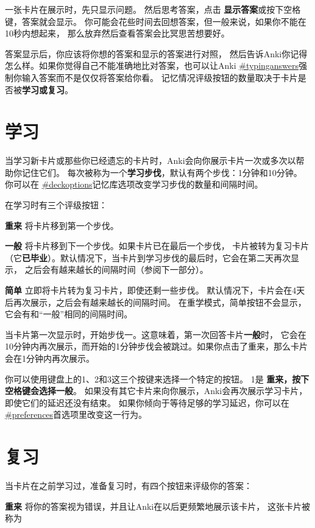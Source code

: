 \documentclass[a4paper]{book}
\begin{document}
	一张卡片在展示时，先只显示问题。 然后思考答案，点击
	\textbf{显示答案}或按下空格键，答案就会显示。 你可能会花些时间去回想答案，但一般来说，如果你不能在10秒内想起来， 那么放弃然后查看答案会比冥思苦想要好。
	
	答案显示后，你应该将你想的答案和显示的答案进行对照， 然后告诉Anki你记得怎么样。如果你觉得自己不能准确地比对答案，也可以让Anki
	\url{#typinganswers}强制你输入答案而不是仅仅将答案给你看。
	记忆情况评级按钮的数量取决于卡片是否被\textbf{学习或复习}。
	
	\section{学习}
	
	当学习新卡片或那些你已经遗忘的卡片时，Anki会向你展示卡片一次或多次以帮助你记住它们。 每次被称为一个\textbf{学习步伐}，默认有两个步伐：1分钟和10分钟。 你可以在
	\url{#deckoptions}记忆库选项改变学习步伐的数量和间隔时间。
	
	在学习时有三个评级按钮：
	
	\textbf{重来} 将卡片移到第一个步伐。
	
	\textbf{一般} 将卡片移到下一个步伐。如果卡片已在最后一个步伐， 卡片被转为复习卡片（它\textbf{已毕业}）。默认情况下，当卡片到学习步伐的最后时，它会在第二天再次显示， 之后会有越来越长的间隔时间（参阅下一部分）。
	
	\textbf{简单} 立即将卡片转为复习卡片，即使还剩一些步伐。 默认情况下，卡片会在4天后再次展示，之后会有越来越长的间隔时间。 在重学模式，简单按钮不会显示，它会有和“一般”相同的间隔时间。
	
	当卡片第一次显示时，开始步伐一。这意味着，第一次回答卡片\textbf{一般}时， 它会在10分钟内再次展示，而开始的1分钟步伐会被跳过。如果你点击了重来，那么卡片会在1分钟内再次展示。
	
	你可以使用键盘上的1、2和3这三个按键来选择一个特定的按钮。 1是
	\textbf{重来，按下空格键会选择一般}。
	如果没有其它卡片来向你展示，Anki会再次展示学习卡片，即使它们的延迟还没有结束。 如果你倾向于等待足够的学习延迟，你可以在
	\url{#preferences}首选项里改变这一行为。
	
	\section{复习}
	
	当卡片在之前学习过，准备复习时，有四个按钮来评级你的答案：
	
	\textbf{重来} 将你的答案视为错误，并且让Anki在以后更频繁地展示该卡片， 这张卡片被称为
	
\end{document}
